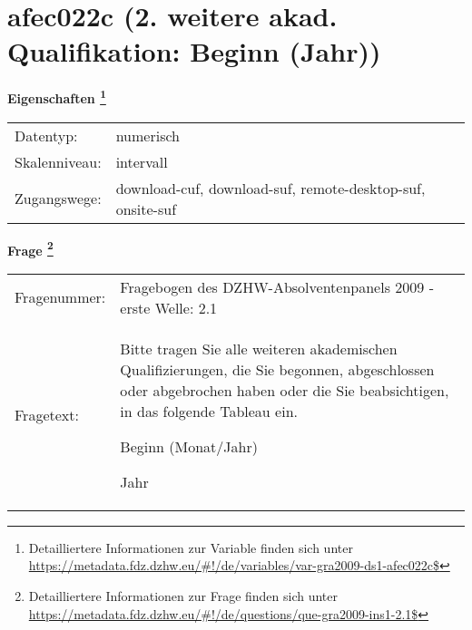 
    \setcounter{footnote}{0}

    \vspace*{-1.8cm}
	\section{afec022c (2. weitere akad. Qualifikation: Beginn (Jahr))}
	\label{section:afec022c}



    \vspace*{0.5cm}
    \noindent\textbf{Eigenschaften
	\footnote{Detailliertere Informationen zur Variable finden sich unter
		\url{https://metadata.fdz.dzhw.eu/\#!/de/variables/var-gra2009-ds1-afec022c$}}}\\
	\begin{tabularx}{\hsize}{@{}lX}
	Datentyp: & numerisch \\
	Skalenniveau: & intervall \\
	Zugangswege: &
	  download-cuf, 
	  download-suf, 
	  remote-desktop-suf, 
	  onsite-suf
 \\
    \end{tabularx}



				\vspace*{0.5cm}
                \noindent\textbf{Frage
	                \footnote{Detailliertere Informationen zur Frage finden sich unter
		              \url{https://metadata.fdz.dzhw.eu/\#!/de/questions/que-gra2009-ins1-2.1$}}}\\
				\begin{tabularx}{\hsize}{@{}lX}
					Fragenummer: &
					  Fragebogen des DZHW-Absolventenpanels 2009 - erste Welle:
					  2.1
 \\
					Fragetext: & Bitte tragen Sie alle weiteren akademischen Qualifizierungen, die Sie begonnen, abgeschlossen oder abgebrochen haben oder die Sie beabsichtigen, in das folgende Tableau ein.\par  Beginn (Monat/Jahr)\par  Jahr \\
				\end{tabularx}





